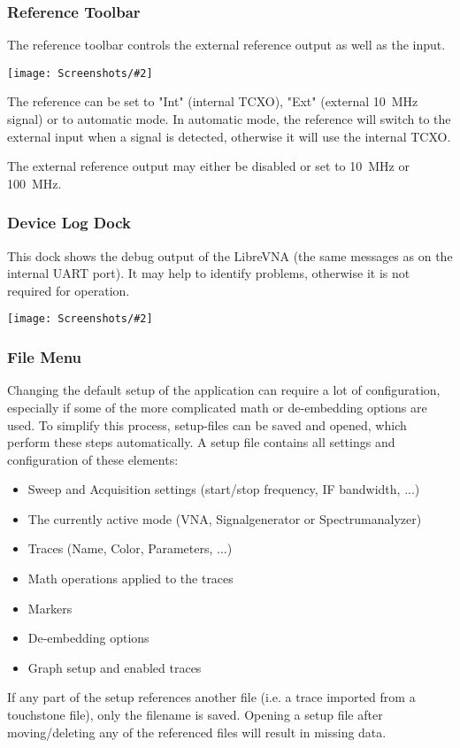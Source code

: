 \documentclass[a4paper,11pt]{article}
\newcommand\danger[1][5ex]{%
  \renewcommand\stacktype{L}%
  \scaleto{\stackon[1.3pt]{\color{red}$\triangle$}{\tiny !}}{#1}%
}
\newenvironment{important}[1][]{%
   \begin{mdframed}[%
      backgroundcolor={red!15}, hidealllines=true,
      skipabove=0.7\baselineskip, skipbelow=0.7\baselineskip,
      splitbottomskip=2pt, splittopskip=4pt, #1]%
   \makebox[0pt]{%
      \smash{%
         \hspace*{-45pt}%
         \raisebox{-5pt}{%
            {\danger}%
         }%
      }%
   }%
}{\end{mdframed}}
\newcommand{\vna}{LibreVNA}
\newcommand{\screenshot}[2]{\begin{center}
\texttt{[image: Screenshots/\#2]}
\end{center}}
\begin{document}
\subsubsection{Reference Toolbar}
The reference toolbar controls the external reference output as well as the input.
\screenshot{0.5}{ToolbarReference.png}
The reference can be set to "Int" (internal TCXO), "Ext" (external \SI{10}{\mega\hertz} signal) or to automatic mode. In automatic mode, the reference will switch to the external input when a signal is detected, otherwise it will use the internal TCXO.

The external reference output may either be disabled or set to \SI{10}{\mega\hertz} or \SI{100}{\mega\hertz}.

\subsubsection{Device Log Dock}
This dock shows the debug output of the \vna{} (the same messages as on the internal UART port). It may help to identify problems, otherwise it is not required for operation.
\screenshot{1.0}{DockDeviceLog.png}

\subsubsection{File Menu}
Changing the default setup of the application can require a lot of configuration, especially if some of the more complicated math or de-embedding options are used. To simplify this process, setup-files can be saved and opened, which perform these steps automatically. A setup file contains all settings and configuration of these elements:
\begin{itemize}
\item Sweep and Acquisition settings (start/stop frequency, IF bandwidth, ...)
\item The currently active mode (VNA, Signalgenerator or Spectrumanalyzer)
\item Traces (Name, Color, Parameters, ...)
\item Math operations applied to the traces
\item Markers
\item De-embedding options
\item Graph setup and enabled traces
\end{itemize}
\begin{important}
If any part of the setup references another file (i.e. a trace imported from a touchstone file), only the filename is saved. Opening a setup file after moving/deleting any of the referenced files will result in missing data. 
\end{important}
\end{document}
